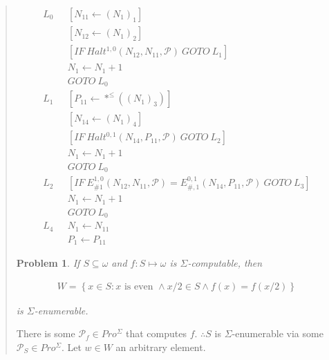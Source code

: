 \documentclass[a4paper, 12pt]{article}
\newtheorem{problem}{Problem}
\newtheorem{problem}{Problem}
\begin{document}
\begin{quote}
\begin{align*}
    L_0~ ~ ~ &[N_{11} \leftarrow (N_1)_1]\\
    &[N_{12} \leftarrow (N_1)_2]\\
    &[IF ~ Halt^{1, 0} \left( N_{12}, N_{11}, \mathcal{P} \right) ~ GOTO ~ L_1 ]
    \\ 
    &N_1 \leftarrow N_1 +1 \\ 
    &GOTO ~ L_0 \\ 
    L_1 ~ ~ ~ &\left[ P_{11} \leftarrow *^{\leq} \left( (N_1)_3 \right)  \right]
    \\  
              &\left[ N_{14} \leftarrow (N_1)_4 \right]  \\ 
              &\left[ IF ~ Halt^{0, 1} \left( N_{14}, P_{11}, \mathcal{P}
              \right) ~ GOTO ~ L_2  \right]  \\ 
              &N_1 \leftarrow  N_1 + 1 \\ 
              &GOTO ~ L_0 \\ 
    L_2 ~ ~ ~ &\left[ IF ~ E_{\# 1}^{1, 0} (N_{12}, N_{11}, \mathcal{P}) =
    E_{\#, 1}^{0, 1} \left( N_{14}, P_{11}, \mathcal{P} \right) ~ GOTO ~ L_{3}
\right]  \\ 
              &N_1 \leftarrow  N_1 + 1 \\ 
              &GOTO ~ L_0 \\ 
    L_4 ~ ~ ~ & N_1 \leftarrow N_{11} \\ 
              &P_1 \leftarrow P_{11}
\end{align*}

\pagebreak
\begin{problem}
    If $S \subseteq \omega$ and $f : S \mapsto \omega$ is $\Sigma$-computable, then 

    \begin{align*}
        W = \left\{ x \in S : x \text{ is even } \land x / 2 \in S \land f(x) =
        f(x / 2)\right\} 
    \end{align*}

    is $\Sigma$-enumerable.
\end{problem}

There is some $\mathcal{P}_f \in Pro^{\Sigma}$ that computes $f$. $\therefore S$
is $\Sigma$-enumerable via some $\mathcal{P}_S \in Pro^{\Sigma}$. Let $w \in W$
an arbitrary element.


\end{quote}
\end{document}
